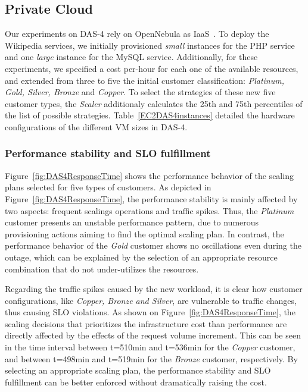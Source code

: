 

\subsection{Private Cloud}

Our experiments on DAS-4 rely on OpenNebula as IaaS~\cite{sotomayor_virtual_2009}. To deploy the Wikipedia services, we initially provisioned \emph{small} instances for the PHP service and one \emph{large} instance for the MySQL service. Additionally, for these experiments, we specified a cost per-hour for each one of the available resources, and extended from three to five the initial customer classification: \emph{Platinum, Gold, Silver, Bronze} and \emph{Copper}. To select the strategies of these new five customer types, the \emph{Scaler} additionaly calculates the 25th and 75th percentiles of the list of possible strategies. Table~\ref{EC2DAS4instances} detailed the hardware configurations of the different VM sizes in DAS-4.




\subsubsection{Performance stability and SLO fulfillment}

Figure~\ref{fig:DAS4ResponseTime} shows the performance behavior of the scaling plans selected for five types of customers. As depicted in Figure~\ref{fig:DAS4ResponseTime}, the performance stability is mainly affected by two aspects: frequent scalings operations and traffic spikes. Thus, the \emph{Platinum} customer presents an unstable performance pattern, due to numerous provisioning actions aiming to find the optimal scaling plan. In contrast, the performance behavior of the \emph{Gold} customer shows no oscillations even during the outage, which can be explained by the selection of an appropriate resource combination that do not under-utilizes the resources.



Regarding the traffic spikes caused by the new workload, it is clear how customer configurations, like \emph{Copper, Bronze and Silver}, are vulnerable to traffic changes, thus causing SLO violations. As shown on Figure~\ref{fig:DAS4ResponseTime},  the scaling decisions that prioritizes the infrastructure cost than performance are directly affected by the effects of the request volume increment. This can be seen in the time interval between t=510min and t=536min for the \emph{Copper} customer, and between t=498min and t=519min for the \emph{Bronze} customer, respectively. By selecting an appropriate scaling plan, the performance stability and SLO fulfillment can be better enforced without dramatically raising the cost.

